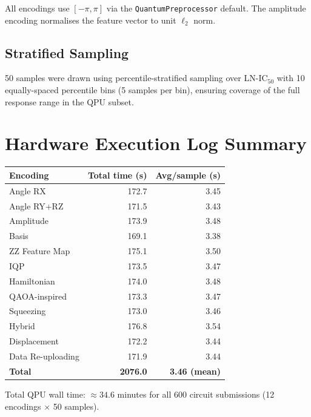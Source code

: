 \documentclass[12pt,a4paper]{article}
\begin{document}
All encodings use $[-\pi, \pi]$ via the \texttt{QuantumPreprocessor} default.
The amplitude encoding normalises the feature vector to unit $\ell_2$ norm.

\subsection{Stratified Sampling}
50 samples were drawn using percentile-stratified sampling over LN-IC$_{50}$
with 10 equally-spaced percentile bins (5 samples per bin), ensuring coverage
of the full response range in the QPU subset.

\section{Hardware Execution Log Summary}
\label{sec:execution}

\begin{center}
\begin{tabular}{@{}lrr@{}}
\toprule
\textbf{Encoding} & \textbf{Total time (s)} & \textbf{Avg/sample (s)} \\
\midrule
Angle RX             & 172.7 & 3.45 \\
Angle RY+RZ          & 171.5 & 3.43 \\
Amplitude            & 173.9 & 3.48 \\
Basis                & 169.1 & 3.38 \\
ZZ Feature Map       & 175.1 & 3.50 \\
IQP                  & 173.5 & 3.47 \\
Hamiltonian          & 174.0 & 3.48 \\
QAOA-inspired        & 173.3 & 3.47 \\
Squeezing            & 173.0 & 3.46 \\
Hybrid               & 176.8 & 3.54 \\
Displacement         & 172.2 & 3.44 \\
Data Re-uploading    & 171.9 & 3.44 \\
\midrule
\textbf{Total}       & \textbf{2076.0} & \textbf{3.46 (mean)} \\
\bottomrule
\end{tabular}
\end{center}

Total QPU wall time: $\approx 34.6$ minutes for all 600 circuit submissions
(12 encodings $\times$ 50 samples).
\end{document}
